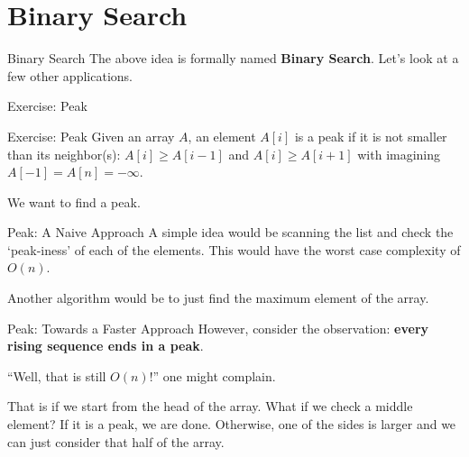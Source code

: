 \documentclass[9pt]{beamer}
\newenvironment{exbox}[1]{\begin{block}{Exercise: #1}}{\end{block}}
\begin{document}
\section{Binary Search}

\begin{frame}{Binary Search}
The above idea is formally named \textbf{Binary Search}. Let's look at a few other applications.
\end{frame}

\begin{frame}{Exercise: Peak}
\begin{exbox}{Peak}
Given an array $A$, an element $A[i]$ is a peak if it is not smaller than its neighbor(s): $A[i] \geq A[i-1]$ and $A[i] \geq A[i+1]$ with imagining $A[-1] = A[n] = -\infty$.

We want to find a peak.
\end{exbox}
\end{frame}

\begin{frame}{Peak: A Naive Approach}
A simple idea would be scanning the list and check the `peak-iness' of each of the elements. This would have the worst case complexity of $O(n)$.

Another algorithm would be to just find the maximum element of the array.
\end{frame}

\begin{frame}{Peak: Towards a Faster Approach}
However, consider the observation: \textbf{every rising sequence ends in a peak}.

``Well, that is still $O(n)$!'' one might complain.

That is if we start from the head of the array. What if we check a middle element? If it is a peak, we are done. Otherwise, one of the sides is larger and we can just consider that half of the array.
\end{frame}
\end{document}
